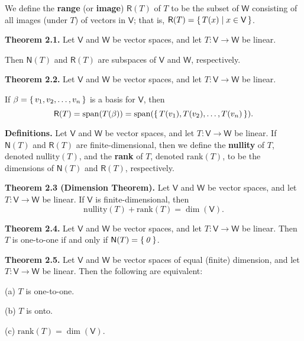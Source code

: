 \documentclass{article}
\newcommand{\0}{\mathit{0}}
\begin{document}
We define the \textbf{range} (or \textbf{image}) $\mathsf{R}(T)$ of $T$ to be the subset of $\mathsf{W}$ 
consisting of all images (under $T$) of vectors in $\mathsf{V}$; that is, 
$\mathsf{R}(T) = \set{T(x) \mid x \in \mathsf{V}}$.

\medskip

\textbf{Theorem 2.1.} Let $\mathsf{V}$ and $\mathsf{W}$ be vector spaces, and let 
$T: \mathsf{V} \to \mathsf{W}$ be linear. 

Then $\mathsf{N}(T)$ and $\mathsf{R}(T)$ are subspaces of $\mathsf{V}$ and $\mathsf{W}$, respectively.

\medskip

\textbf{Theorem 2.2.} Let $\mathsf{V}$ and $\mathsf{W}$ be vector spaces, and let 
$T: \mathsf{V} \to \mathsf{W}$ be linear. 

If $\beta = \set{v_1, v_2, \dots, v_n}$ is a basis for $\mathsf{V}$, then
\[
\mathsf{R}(T) = \mathrm{span}(T(\beta)) = \mathrm{span}(\set{T(v_1), T(v_2), \dots, T(v_n)}).
\]

\medskip

\textbf{Definitions.} Let $\mathsf{V}$ and $\mathsf{W}$ be vector spaces, and let 
$T: \mathsf{V} \to \mathsf{W}$ be linear. 
If $\mathsf{N}(T)$ and $\mathsf{R}(T)$ are finite-dimensional, then we define the 
\textbf{nullity} of $T$, denoted $\mathrm{nullity}(T)$, and the \textbf{rank} of $T$, 
denoted $\mathrm{rank}(T)$, to be the dimensions of $\mathsf{N}(T)$ and $\mathsf{R}(T)$, respectively.

\medskip

\textbf{Theorem 2.3 (Dimension Theorem).} Let $\mathsf{V}$ and $\mathsf{W}$ be vector spaces, 
and let $T: \mathsf{V} \to \mathsf{W}$ be linear. 
If $\mathsf{V}$ is finite-dimensional, then
\[
\mathrm{nullity}(T) + \mathrm{rank}(T) = \dim(\mathsf{V}).
\]

\medskip

\textbf{Theorem 2.4.} Let $\mathsf{V}$ and $\mathsf{W}$ be vector spaces, and let 
$T: \mathsf{V} \to \mathsf{W}$ be linear. 
Then $T$ is one-to-one if and only if $\mathsf{N}(T) = \set{\0}$.

\medskip

\textbf{Theorem 2.5.} Let $\mathsf{V}$ and $\mathsf{W}$ be vector spaces of equal (finite) 
dimension, and let $T: \mathsf{V} \to \mathsf{W}$ be linear. Then the following are equivalent:

(a) $T$ is one-to-one.

(b) $T$ is onto.

(c) $\mathrm{rank}(T) = \dim(\mathsf{V})$.
\end{document}
